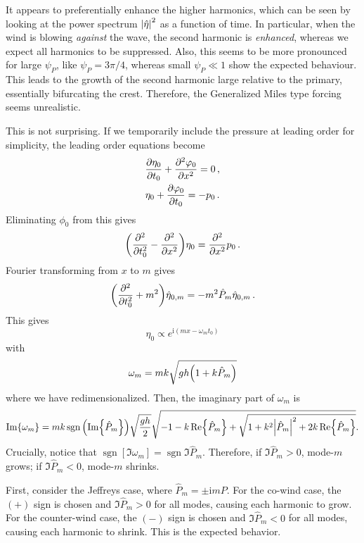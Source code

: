 \documentclass{jfm}
\newcommand{\GenP}{\hat{P}_m}
\DeclareMathOperator{\sgn}{sgn}
\newcommand{\im}{\mathrm{i}}
\begin{document}
It appears to preferentially enhance the higher harmonics, which can be
seen by looking at the power spectrum $\abs{\hat{\eta}}^2$ as a function
of time.
In particular, when the wind is blowing \emph{against} the wave, the
second harmonic is \emph{enhanced}, whereas we expect all harmonics to
be suppressed.
Also, this seems to be more pronounced for large $\psi_P$, like $\psi_P
= 3\pi/4$, whereas small $\psi_P \ll 1$ show the expected behaviour.
This leads to the growth of the second harmonic large relative to the
primary, essentially bifurcating the crest.
Therefore, the Generalized Miles type forcing seems unrealistic.

This is not surprising.
If we temporarily include the pressure at leading order for simplicity,
the leading order equations become
\begin{gather}
  \pdv{\eta_0}{t_0} + \pdv[2]{\varphi_0}{x} = 0 \,, \\
  \eta_0 + \pdv{\varphi_0}{t_0} = -p_0 \,.
\end{gather}
Eliminating $\phi_0$ from this gives
\begin{equation}
  \pqty{\pdv[2]{t_0} - \pdv[2]{x} } \eta_0 = \pdv[2]{x} p_0 \,.
\end{equation}
Fourier transforming from $x$ to $m$ gives
\begin{equation}
  \pqty{\pdv[2]{t_0} + m^2 } \hat{\eta}_{0,m} = -m^2 \GenP
  \hat{\eta}_{0,m} \,.
\end{equation}
This gives
\begin{equation}
  \eta_0 \propto e^{\im(m x - \omega_m t_0)}
\end{equation}
with
\begin{equation}
  \omega_m = mk \sqrt{gh \pqty{1 + k \GenP}}
\end{equation}
where we have redimensionalized.
Then, the imaginary part of $\omega_m$ is
\begin{equation}
  \Im{\omega_m} = mk \sgn \pqty{\Im{\GenP}} \sqrt{\frac{gh}{2}} \sqrt{-1
    - k\Re{\GenP} + \sqrt{1 + k^2 \abs{\GenP}^2 + 2 k \Re{\GenP}}} .
\end{equation}
Crucially, notice that $\sgn[\Im{\omega_m}] = \sgn{\Im{\GenP}}$.
Therefore, if $\Im{\GenP}>0$, mode-$m$ grows; if $\Im{\GenP} <
0$, mode-$m$ shrinks.

First, consider the Jeffreys case, where $\GenP = \pm \im m P$.
For the co-wind case, the $(+)$ sign is chosen and $\Im{\GenP} > 0$ for
all modes, causing each harmonic to grow.
For the counter-wind case, the $(-)$ sign is chosen and $\Im{\GenP} < 0$
for all modes, causing each harmonic to shrink.
This is the expected behavior.
\end{document}
